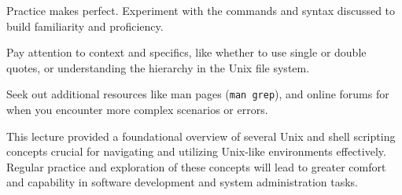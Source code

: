 \documentclass{article}
\begin{document}
Practice makes perfect. Experiment with the commands and syntax discussed to build familiarity and proficiency.

Pay attention to context and specifics, like whether to use single or double quotes, or understanding the hierarchy in the Unix file system.

Seek out additional resources like man pages (\texttt{man grep}), and online forums for when you encounter more complex scenarios or errors.

This lecture provided a foundational overview of several Unix and shell scripting concepts crucial for navigating and utilizing Unix-like environments effectively. Regular practice and exploration of these concepts will lead to greater comfort and capability in software development and system administration tasks.
\end{document}

